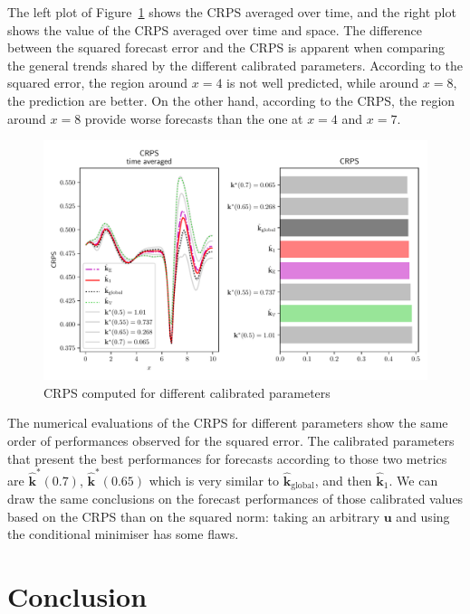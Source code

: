 \documentclass[preprint, 1p]{elsarticle}
\newcommand{\kest}{\hat{\mathbf{k}}}
\newcommand{\victor}[1]{{\itshape\color{green} ({#1})}}
\begin{document}
The left plot of Figure~\ref{fig:forecast_crps} shows the CRPS averaged over time, and the right plot shows the value of the CRPS averaged over time and space. The difference between the squared forecast error and the CRPS is apparent when comparing the general trends shared by the different calibrated parameters. According to the squared error, the region around $x=4$ is not well predicted, while around $x=8$, the prediction are better. On the other hand, according to the CRPS, the region around $x=8$ provide worse forecasts than the one at $x=4$ and $x=7$. 

\begin{figure}[!h]
  \centering
  \includegraphics[width=.9\textwidth]{Figures/CRPS_full}
  \caption{CRPS computed for different calibrated parameters}
\label{fig:forecast_crps}
\end{figure}
The numerical evaluations of the CRPS for different parameters show the same order of performances observed for the squared error.
The calibrated parameters that present the best performances for forecasts according to those two metrics are $\kest^*(0.7)$, $\kest^*(0.65)$ which is very similar to $\kest_{\mathrm{global}}$, and then $\kest_1$.
We can draw the same conclusions on the forecast performances of those calibrated values based on the CRPS than on the squared norm: taking an arbitrary $\mathbf{u}$ and using the conditional minimiser has some flaws.

\clearpage

\section*{Conclusion}  
\end{document}
